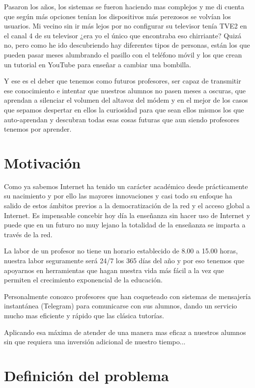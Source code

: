 \bigskip
Pasaron los años, los sistemas se fueron haciendo mas complejos y me di cuenta que según más opciones tenían los dispositivos más perezosos se volvían los usuarios. Mi vecino sin ir más lejos por no configurar su televisor tenía TVE2 en el canal 4 de su televisor ¿era yo el único que encontraba eso chirriante? Quizá no, pero como he ido descubriendo hay diferentes tipos de personas, están los que pueden pasar meses alumbrando el pasillo con el teléfono móvil y los que crean un tutorial en YouTube para enseñar a cambiar una bombilla.

\bigskip
Y ese es el deber que tenemos como futuros profesores, ser capaz de transmitir ese conocimiento e intentar que nuestros alumnos no pasen meses a oscuras, que aprendan a silenciar el volumen del altavoz del módem y en el mejor de los casos que sepamos despertar en ellos la curiosidad para que sean ellos mismos los que auto-aprendan y descubran todas esas cosas futuras que aun siendo profesores tenemos por aprender.

\section{Motivación}

Como ya sabemos Internet ha tenido un carácter académico desde prácticamente su nacimiento y por ello las mayores innovaciones y casi todo su enfoque ha salido de estos ámbitos previos a la democratización de la red y el acceso global a Internet. Es impensable concebir hoy día la enseñanza sin hacer uso de Internet y puede que en un futuro no muy lejano la totalidad de la enseñanza se imparta a través de la red.

\bigskip
La labor de un profesor no tiene un horario establecido de 8.00 a 15.00 horas, nuestra labor seguramente será 24/7 los 365 días del año y por eso tenemos que apoyarnos en herramientas que hagan nuestra vida más fácil a la vez que permiten el crecimiento exponencial de la educación.

\bigskip
Personalmente conozco profesores que han coqueteado con sistemas de mensajería instantánea (Telegram) para comunicarse con sus alumnos, dando un servicio mucho mas eficiente y rápido que las clásica tutorías.

Aplicando esa máxima de atender de una manera mas eficaz a nuestros alumnos sin que requiera una inversión adicional de nuestro tiempo...



\section{Definición del problema}


